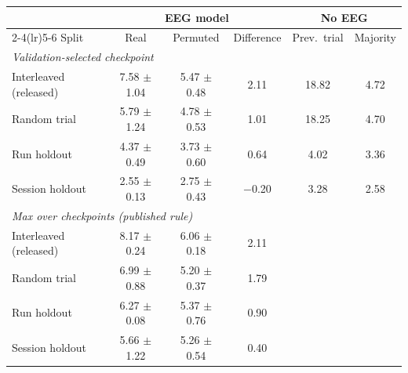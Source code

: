 \setlength{\tabcolsep}{4pt}
\begin{tabular}{lccccc}
\toprule
 & \multicolumn{3}{c}{EEG model} & \multicolumn{2}{c}{No EEG} \\
\cmidrule(lr){2-4}\cmidrule(lr){5-6}
Split & Real & Permuted & Difference & Prev.\ trial & Majority \\
\midrule
\multicolumn{6}{l}{\emph{Validation-selected checkpoint}} \\
Interleaved (released) & 7.58 $\pm$ 1.04 & 5.47 $\pm$ 0.48 & 2.11 & 18.82 & 4.72 \\
Random trial & 5.79 $\pm$ 1.24 & 4.78 $\pm$ 0.53 & 1.01 & 18.25 & 4.70 \\
Run holdout & 4.37 $\pm$ 0.49 & 3.73 $\pm$ 0.60 & 0.64 & 4.02 & 3.36 \\
Session holdout & 2.55 $\pm$ 0.13 & 2.75 $\pm$ 0.43 & $-$0.20 & 3.28 & 2.58 \\
\multicolumn{6}{l}{\emph{Max over checkpoints (published rule)}} \\
Interleaved (released) & 8.17 $\pm$ 0.24 & 6.06 $\pm$ 0.18 & 2.11 &  &  \\
Random trial & 6.99 $\pm$ 0.88 & 5.20 $\pm$ 0.37 & 1.79 &  &  \\
Run holdout & 6.27 $\pm$ 0.08 & 5.37 $\pm$ 0.76 & 0.90 &  &  \\
Session holdout & 5.66 $\pm$ 1.22 & 5.26 $\pm$ 0.54 & 0.40 &  &  \\
\bottomrule
\end{tabular}

